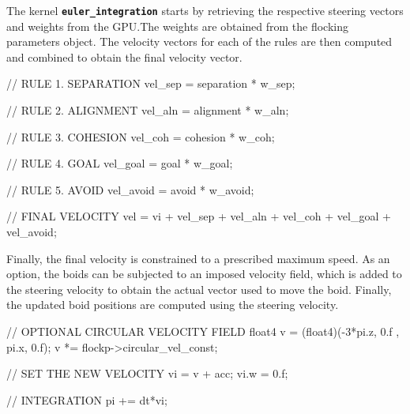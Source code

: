The kernel \texttt{\textbf{euler\_integration}} starts by retrieving the respective steering vectors and weights from the GPU.The weights are obtained from the flocking parameters object. The velocity vectors for each of the rules are then computed and combined to obtain the final velocity vector.

\begin{cppcode}{0}
// RULE 1. SEPARATION
vel_sep = separation * w_sep;
   
// RULE 2. ALIGNMENT
vel_aln = alignment * w_aln;

// RULE 3. COHESION
vel_coh = cohesion * w_coh;

// RULE 4. GOAL
vel_goal = goal * w_goal;

// RULE 5. AVOID
vel_avoid = avoid * w_avoid;

// FINAL VELOCITY
vel = vi + vel_sep + vel_aln + vel_coh + vel_goal + vel_avoid;
\end{cppcode}

Finally, the final velocity is constrained to a prescribed maximum speed. As an option, the boids can be subjected to an imposed velocity field, which is added to the steering velocity to obtain the actual vector used to move the boid. Finally, the updated boid positions are computed using the steering velocity.

\begin{cppcode}{0}
// OPTIONAL CIRCULAR VELOCITY FIELD
float4 v = (float4)(-3*pi.z, 0.f , pi.x, 0.f);
v *= flockp->circular_vel_const;

// SET THE NEW VELOCITY
vi = v + acc;
vi.w = 0.f;

// INTEGRATION
pi += dt*vi; 
\end{cppcode}
 


